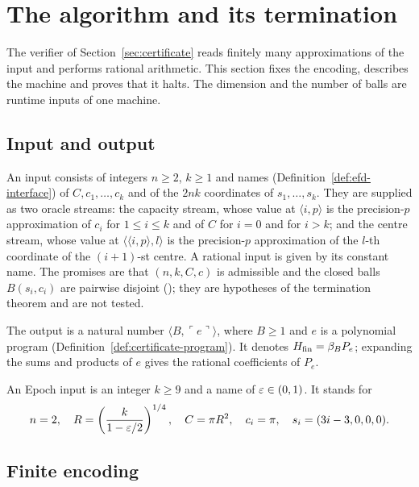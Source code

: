 \section{The algorithm and its termination}\label{sec:alg}

The verifier of Section~\ref{sec:certificate} reads finitely many approximations of the input and performs
rational arithmetic. This section fixes the encoding, describes the machine and proves that it halts. The
dimension and the number of balls are runtime inputs of one machine.

\subsection{Input and output}\label{sec:alg-input}

\begin{definition}[Input]\label{def:alg-input}
An input consists of integers $n\ge2$, $k\ge1$ and names (Definition~\ref{def:efd-interface}) of $C,c_1,\ldots,c_k$
and of the $2nk$ coordinates of $s_1,\ldots,s_k$. They are supplied as two oracle streams: the capacity stream,
whose value at $\langle i,p\rangle$ is the precision-$p$ approximation of $c_i$ for $1\le i\le k$ and of $C$ for $i=0$ and for $i>k$;
and the centre stream, whose value at $\langle\langle i,p\rangle,l\rangle$ is the precision-$p$ approximation of the
$l$-th coordinate of the $(i+1)$-st centre. A rational input is given by its constant name. The promises are that
$(n,k,C,c)$ is admissible and the closed balls $B(s_i,c_i)$ are pairwise disjoint (); they are
hypotheses of the termination theorem and are not tested.

The output is a natural number $\langle B,\ulcorner e\urcorner\rangle$, where $B\ge1$ and $e$ is a polynomial program
(Definition~\ref{def:certificate-program}). It denotes $H_{\mathrm{fin}}=\beta_BP_e$; expanding the sums and products of $e$
gives the rational coefficients of $P_e$.

An Epoch input is an integer $k\ge9$ and a name of $\varepsilon\in(0,1)$. It stands for
\begin{equation}\label{eq:alg-epoch-data}
 n=2,\quad R=\left(\frac{k}{1-\varepsilon/2}\right)^{1/4},\quad
 C=\pi R^2,\quad c_i=\pi,\quad s_i=(3i-3,0,0,0).
\end{equation}
\end{definition}

\subsection{Finite encoding}\label{sec:alg-searches}

